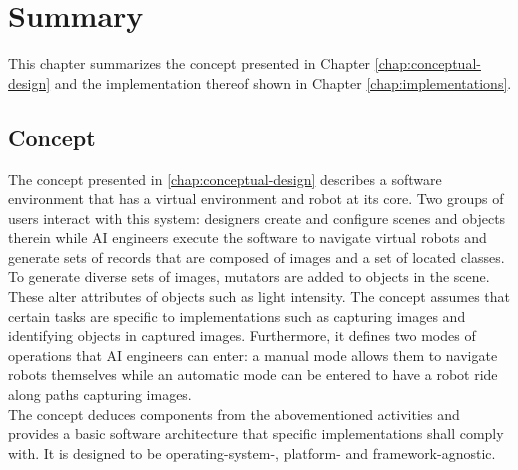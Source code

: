 \chapter{Summary}
This chapter summarizes the concept presented in Chapter \ref{chap:conceptual-design} and the implementation thereof shown in Chapter \ref{chap:implementations}.

\section{Concept}
The concept presented in \ref{chap:conceptual-design} describes a software environment that has a virtual environment and robot at its core. Two groups of users interact with this system: designers create and configure scenes and objects therein while \ac{AI} engineers execute the software to navigate virtual robots and generate sets of records that are composed of images and a set of located classes. To generate diverse sets of images, mutators are added to objects in the scene. These alter attributes of objects such as light intensity. The concept assumes that certain tasks are specific to implementations such as capturing images and identifying objects in captured images. Furthermore, it defines two modes of operations that \ac{AI} engineers can enter: a manual mode allows them to navigate robots themselves while an automatic mode can be entered to have a robot ride along paths capturing images.\\
The concept deduces components from the abovementioned activities and provides a basic software architecture that specific implementations shall comply with. It is designed to be operating-system-, platform- and framework-agnostic.


